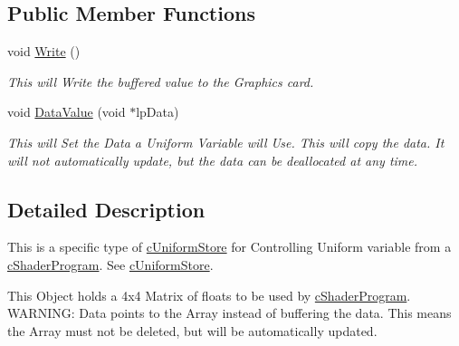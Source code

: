 \subsection*{Public Member Functions}
\begin{DoxyCompactItemize}
\item 
\hypertarget{classc_uniform_matrix4_a8b9a51295142694ac296ac41c8b0f7a5}{
void \hyperlink{classc_uniform_matrix4_a8b9a51295142694ac296ac41c8b0f7a5}{Write} ()}
\label{classc_uniform_matrix4_a8b9a51295142694ac296ac41c8b0f7a5}

\begin{DoxyCompactList}\small\item\em This will Write the buffered value to the Graphics card. \end{DoxyCompactList}\item 
\hypertarget{classc_uniform_matrix4_ae7b48dac300e6c49272f5fd9734ce877}{
void \hyperlink{classc_uniform_matrix4_ae7b48dac300e6c49272f5fd9734ce877}{DataValue} (void $\ast$lpData)}
\label{classc_uniform_matrix4_ae7b48dac300e6c49272f5fd9734ce877}

\begin{DoxyCompactList}\small\item\em This will Set the Data a Uniform Variable will Use. This will copy the data. It will not automatically update, but the data can be deallocated at any time. \end{DoxyCompactList}\end{DoxyCompactItemize}


\subsection{Detailed Description}
This is a specific type of \hyperlink{classc_uniform_store}{cUniformStore} for Controlling Uniform variable from a \hyperlink{classc_shader_program}{cShaderProgram}. See \hyperlink{classc_uniform_store}{cUniformStore}. 

This Object holds a 4x4 Matrix of floats to be used by \hyperlink{classc_shader_program}{cShaderProgram}. WARNING: Data points to the Array instead of buffering the data. This means the Array must not be deleted, but will be automatically updated. 